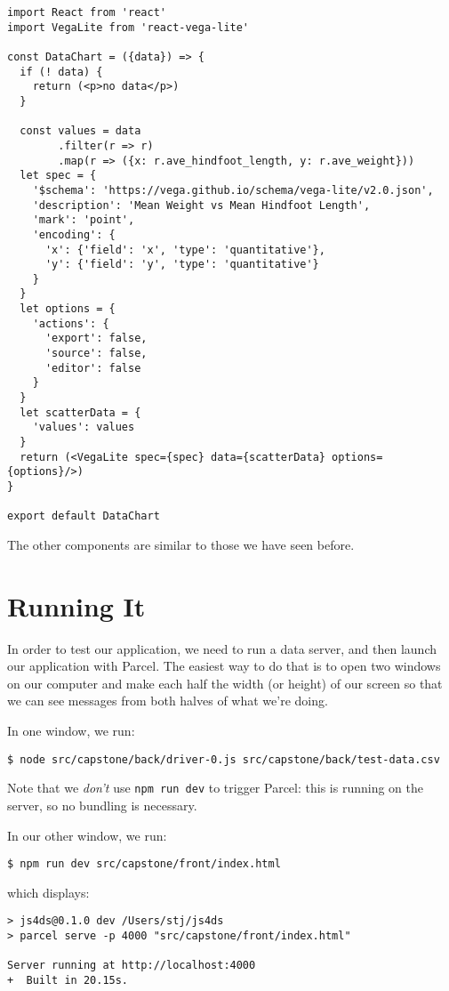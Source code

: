 \begin{verbatim}
import React from 'react'
import VegaLite from 'react-vega-lite'

const DataChart = ({data}) => {
  if (! data) {
    return (<p>no data</p>)
  }

  const values = data
        .filter(r => r)
        .map(r => ({x: r.ave_hindfoot_length, y: r.ave_weight}))
  let spec = {
    '$schema': 'https://vega.github.io/schema/vega-lite/v2.0.json',
    'description': 'Mean Weight vs Mean Hindfoot Length',
    'mark': 'point',
    'encoding': {
      'x': {'field': 'x', 'type': 'quantitative'},
      'y': {'field': 'y', 'type': 'quantitative'}
    }
  }
  let options = {
    'actions': {
      'export': false,
      'source': false,
      'editor': false
    }
  }
  let scatterData = {
    'values': values
  }
  return (<VegaLite spec={spec} data={scatterData} options={options}/>)
}

export default DataChart
\end{verbatim}

\noindent
The other components are similar to those we have seen before.

\section{Running It}\label{s:capstone-run}

In order to test our application,
we need to run a data server,
and then launch our application with Parcel.
The easiest way to do that is to open two windows on our computer
and make each half the width (or height) of our screen
so that we can see messages from both halves of what we're doing.

In one window,
we run:

\begin{verbatim}
$ node src/capstone/back/driver-0.js src/capstone/back/test-data.csv
\end{verbatim}

\noindent
Note that we \emph{don't} use \texttt{npm\ run\ dev} to trigger Parcel:
this is running on the server,
so no bundling is necessary.

In our other window,
we run:

\begin{verbatim}
$ npm run dev src/capstone/front/index.html
\end{verbatim}

\noindent
which displays:

\begin{verbatim}
> js4ds@0.1.0 dev /Users/stj/js4ds
> parcel serve -p 4000 "src/capstone/front/index.html"

Server running at http://localhost:4000
+  Built in 20.15s.
\end{verbatim}

